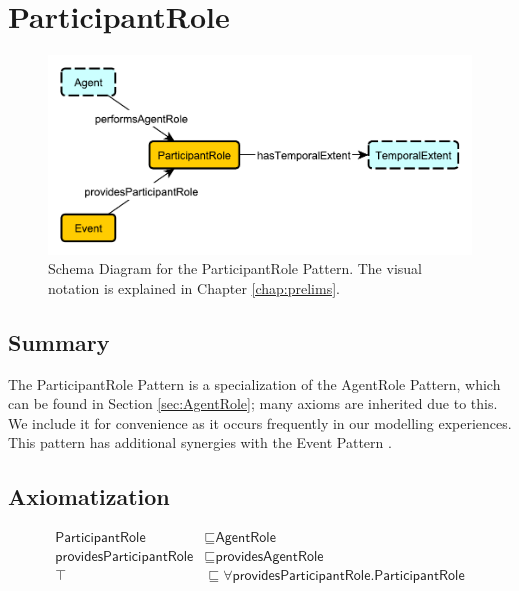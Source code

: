\section{ParticipantRole}
\label{sec:ParticipantRole}
\begin{figure}[h!]
\begin{center}
\includegraphics[width=.8\textwidth]{figures/participantrole}
\end{center}
\caption{Schema Diagram for the ParticipantRole Pattern. The visual notation is explained in Chapter \ref{chap:prelims}.}
\label{fig:ParticipantRole}
\end{figure}
\subsection{Summary}
\label{sum:ParticipantRole}
The \textsf{ParticipantRole} Pattern is a specialization of the \textsf{AgentRole} Pattern, which can be found in Section \ref{sec:AgentRole}; many axioms are inherited due to this. We include it for convenience as it occurs frequently in our modelling experiences. This pattern has additional synergies with the \textsf{Event} Pattern \cite{event,enslave}.

\subsection{Axiomatization}
\label{axs:ParticipantRole}
\begin{align}
\textsf{ParticipantRole} &\sqsubseteq \textsf{AgentRole} \\
\textsf{providesParticipantRole} &\sqsubseteq \textsf{providesAgentRole} \\
\top &\sqsubseteq \forall \textsf{providesParticipantRole.ParticipantRole} 
\end{align}

